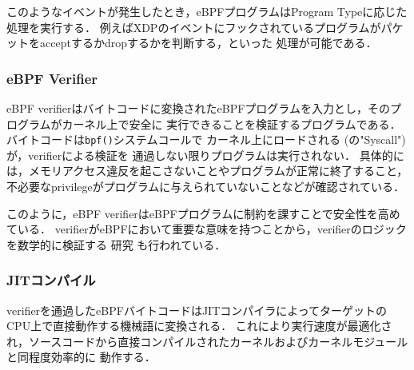 このようなイベントが発生したとき，eBPFプログラムはProgram Typeに応じた処理を実行する．
例えばXDPのイベントにフックされているプログラムがパケットをacceptするかdropするかを判断する，といった
処理が可能である．

\subsubsection{eBPF Verifier}
eBPF verifierはバイトコードに変換されたeBPFプログラムを入力とし，そのプログラムがカーネル上で安全に
実行できることを検証するプログラムである．バイトコードは\texttt{bpf()}システムコールで
カーネル上にロードされる (の"Syscall") が，verifierによる検証を
通過しない限りプログラムは実行されない．
具体的には，メモリアクセス違反を起こさないことやプログラムが正常に終了すること，
不必要なprivilegeがプログラムに与えられていないことなどが確認されている．

このように，eBPF verifierはeBPFプログラムに制約を課すことで安全性を高めている．
verifierがeBPFにおいて重要な意味を持つことから，verifierのロジックを数学的に検証する
研究 \cite{vishwanathan2023verifying}も行われている．

\subsubsection{JITコンパイル}
verifierを通過したeBPFバイトコードはJITコンパイラによってターゲットのCPU上で直接動作する機械語に変換される．
これにより実行速度が最適化され，ソースコードから直接コンパイルされたカーネルおよびカーネルモジュールと同程度効率的に
動作する．
